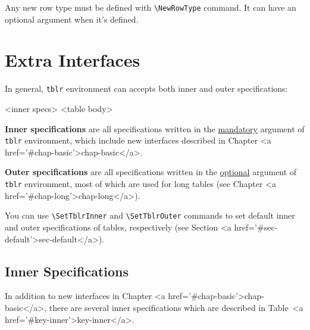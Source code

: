 \documentclass[oneside]{book}
\begin{document}
Any new row type must be defined with \verb!\NewRowType! command.
It can have an optional argument when it's defined.

\chapter{Extra Interfaces}
\label{chap:extra}

In general, \verb!tblr! environment can accepts both inner and outer specifications:

\begin{codehigh}
\begin{tblr}{<inner specs>}
<table body>
\end{tblr}
\end{codehigh}

\textbf{Inner specifications} are all specifications written in the \underline{mandatory} argument
of \verb!tblr! environment, which include new interfaces described in Chapter <a href='#chap-basic'>chap-basic</a>.

\textbf{Outer specifications} are all specifications written in the \underline{optional} argument
of \verb!tblr! environment, most of which are used for long tables (see Chapter <a href='#chap-long'>chap-long</a>).

You can use \verb!\SetTblrInner! and \verb!\SetTblrOuter! commands
to set default inner and outer specifications of tables, respectively (see Section <a href='#sec-default'>sec-default</a>).

\section{Inner Specifications}

In addition to new interfaces in Chapter <a href='#chap-basic'>chap-basic</a>,
there are several inner specifications which are described in Table~<a href='#key-inner'>key-inner</a>.
\end{document}
